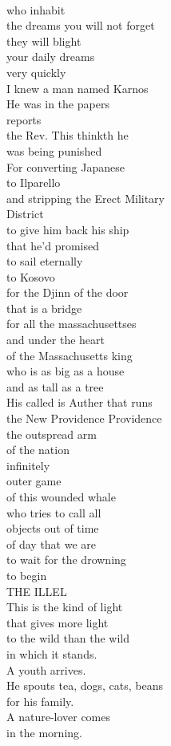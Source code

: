 \documentclass[smalldemyvopaper,11pt,twoside,onecolumn,openright,extrafontsizes]{memoir}
\begin{document}
\\who inhabit
\\the dreams you will not forget
\\they will blight
\\your daily dreams
\\very quickly
\\I knew a man named Karnos
\\He was in the papers
\\reports
\\the Rev. This thinkth he
\\was being punished
\\For converting Japanese
\\to Ilparello
\\and stripping the Erect Military
\\District
\\to give him back his ship
\\that he'd promised
\\to sail eternally
\\to Kosovo
\\for the Djinn of the door
\\that is a bridge
\\for all the massachusettses
\\and under the heart
\\of the Massachusetts king
\\who is as big as a house
\\and as tall as a tree
\\His called is Auther that runs
\\the New Providence Providence
\\the outspread arm
\\of the nation
\\infinitely
\\outer game
\\of this wounded whale
\\who tries to call all
\\objects out of time
\\of day that we are
\\to wait for the drowning
\\to begin
\\THE ILLEL
\\This is the kind of light
\\that gives more light
\\to the wild than the wild
\\in which it stands.
\\A youth arrives.
\\He spouts tea, dogs, cats, beans
\\for his family.
\\A nature-lover comes
\\in the morning.
\end{document}
